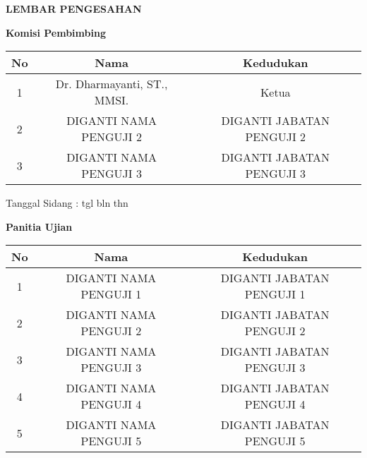 \newpage
{}
\begin{center}
    {\large \bf \centering LEMBAR PENGESAHAN}

    \vspace{0.75cm}

    {\bf Komisi Pembimbing}

    \vspace{0.5cm}

    \begin{tabular}{|c|c|c|}
        \hline
        No & Nama                        & Kedudukan                 \\
        \hline

        1  & Dr. Dharmayanti, ST., MMSI. & Ketua                     \\
        \hline

        2  & DIGANTI NAMA PENGUJI 2      & DIGANTI JABATAN PENGUJI 2 \\
        \hline
        3  & DIGANTI NAMA PENGUJI 3      & DIGANTI JABATAN PENGUJI 3 \\
        \hline
    \end{tabular}

    \vspace{0.1cm}
    \begin{flushright}
        {Tanggal Sidang : tgl bln thn}
    \end{flushright}

    \vspace{0.5cm}

    {\bf Panitia Ujian}

    \vspace{0.5cm}

    \begin{tabular}{|c|c|c|}
        \hline
        No & Nama                   & Kedudukan                 \\
        \hline

        1  & DIGANTI NAMA PENGUJI 1 & DIGANTI JABATAN PENGUJI 1 \\
        \hline

        2  & DIGANTI NAMA PENGUJI 2 & DIGANTI JABATAN PENGUJI 2 \\
        \hline
        3  & DIGANTI NAMA PENGUJI 3 & DIGANTI JABATAN PENGUJI 3 \\
        \hline
        4  & DIGANTI NAMA PENGUJI 4 & DIGANTI JABATAN PENGUJI 4 \\
        \hline
        5  & DIGANTI NAMA PENGUJI 5 & DIGANTI JABATAN PENGUJI 5 \\
        \hline
    \end{tabular}


\end{center}

